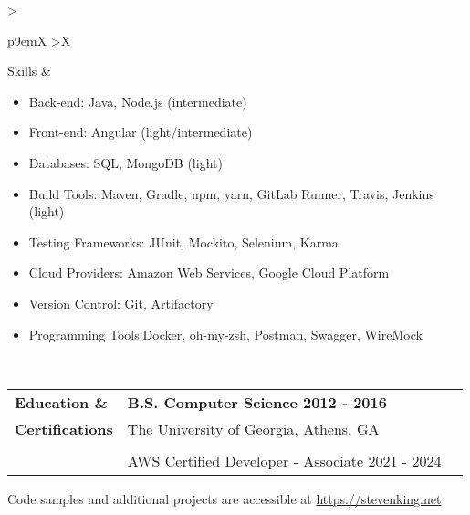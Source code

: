\documentclass[final]{letter}
\begin{document}
	\begin{tabularx}{\linewidth}{
		>{\raggedright\bf\Large}p{9em}X
		>{\centering}X
	} 
		Skills & \begin{itemize}[topsep=1pt,noitemsep]
			\item[] Back-end: \tab Java, Node.js (intermediate)
			\item[] Front-end: \tab Angular (light/intermediate)
			\item[] Databases: \tab SQL, MongoDB (light)
			\item[] Build Tools: \tab Maven, Gradle, npm, yarn, GitLab Runner, Travis, Jenkins (light)
			\item[] Testing Frameworks: \tab JUnit, Mockito, Selenium, Karma
			\item[] Cloud Providers: \tab Amazon Web Services, Google Cloud Platform
			\item[] Version Control: \tab Git, Artifactory
			\item[] Programming Tools:\tab Docker, oh-my-zsh, Postman, Swagger, WireMock
		\end{itemize}
	\end{tabularx} \\

	\begin{tabularx}{\linewidth} {
		>{\raggedright\bf\Large}p{10em}X
		>{\centering}X
	} 
		Education \& & \large\bf{B.S. Computer Science \hfill 2012 - 2016} \\
		Certifications & The University of Georgia, Athens, GA \\
		& \\
		& AWS Certified Developer - Associate \hfill 2021 - 2024
	\end{tabularx}

	\vspace{1.5em}

	\begin{center}
		Code samples and additional projects are accessible at \href{https://stevenking.net}{https://stevenking.net}
	\end{center}
\end{document}

